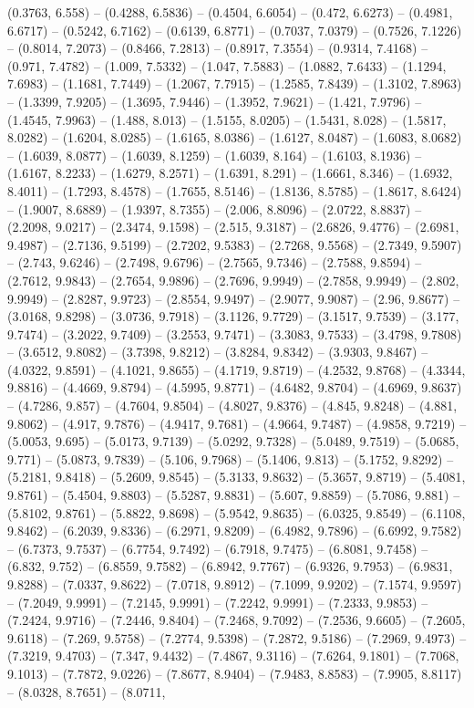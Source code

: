 (0.3763, 6.558) -- (0.4288, 6.5836) -- (0.4504, 6.6054) -- (0.472, 6.6273) -- (0.4981, 6.6717) -- (0.5242, 6.7162) -- (0.6139, 6.8771) -- (0.7037, 7.0379) -- (0.7526, 7.1226) -- (0.8014, 7.2073) -- (0.8466, 7.2813) -- (0.8917, 7.3554) -- (0.9314, 7.4168) -- (0.971, 7.4782) -- (1.009, 7.5332) -- (1.047, 7.5883) -- (1.0882, 7.6433) -- (1.1294, 7.6983) -- (1.1681, 7.7449) -- (1.2067, 7.7915) -- (1.2585, 7.8439) -- (1.3102, 7.8963) -- (1.3399, 7.9205) -- (1.3695, 7.9446) -- (1.3952, 7.9621) -- (1.421, 7.9796) -- (1.4545, 7.9963) -- (1.488, 8.013) -- (1.5155, 8.0205) -- (1.5431, 8.028) -- (1.5817, 8.0282) -- (1.6204, 8.0285) -- (1.6165, 8.0386) -- (1.6127, 8.0487) -- (1.6083, 8.0682) -- (1.6039, 8.0877) -- (1.6039, 8.1259) -- (1.6039, 8.164) -- (1.6103, 8.1936) -- (1.6167, 8.2233) -- (1.6279, 8.2571) -- (1.6391, 8.291) -- (1.6661, 8.346) -- (1.6932, 8.4011) -- (1.7293, 8.4578) -- (1.7655, 8.5146) -- (1.8136, 8.5785) -- (1.8617, 8.6424) -- (1.9007, 8.6889) -- (1.9397, 8.7355) -- (2.006, 8.8096) -- (2.0722, 8.8837) -- (2.2098, 9.0217) -- (2.3474, 9.1598) -- (2.515, 9.3187) -- (2.6826, 9.4776) -- (2.6981, 9.4987) -- (2.7136, 9.5199) -- (2.7202, 9.5383) -- (2.7268, 9.5568) -- (2.7349, 9.5907) -- (2.743, 9.6246) -- (2.7498, 9.6796) -- (2.7565, 9.7346) -- (2.7588, 9.8594) -- (2.7612, 9.9843) -- (2.7654, 9.9896) -- (2.7696, 9.9949) -- (2.7858, 9.9949) -- (2.802, 9.9949) -- (2.8287, 9.9723) -- (2.8554, 9.9497) -- (2.9077, 9.9087) -- (2.96, 9.8677) -- (3.0168, 9.8298) -- (3.0736, 9.7918) -- (3.1126, 9.7729) -- (3.1517, 9.7539) -- (3.177, 9.7474) -- (3.2022, 9.7409) -- (3.2553, 9.7471) -- (3.3083, 9.7533) -- (3.4798, 9.7808) -- (3.6512, 9.8082) -- (3.7398, 9.8212) -- (3.8284, 9.8342) -- (3.9303, 9.8467) -- (4.0322, 9.8591) -- (4.1021, 9.8655) -- (4.1719, 9.8719) -- (4.2532, 9.8768) -- (4.3344, 9.8816) -- (4.4669, 9.8794) -- (4.5995, 9.8771) -- (4.6482, 9.8704) -- (4.6969, 9.8637) -- (4.7286, 9.857) -- (4.7604, 9.8504) -- (4.8027, 9.8376) -- (4.845, 9.8248) -- (4.881, 9.8062) -- (4.917, 9.7876) -- (4.9417, 9.7681) -- (4.9664, 9.7487) -- (4.9858, 9.7219) -- (5.0053, 9.695) -- (5.0173, 9.7139) -- (5.0292, 9.7328) -- (5.0489, 9.7519) -- (5.0685, 9.771) -- (5.0873, 9.7839) -- (5.106, 9.7968) -- (5.1406, 9.813) -- (5.1752, 9.8292) -- (5.2181, 9.8418) -- (5.2609, 9.8545) -- (5.3133, 9.8632) -- (5.3657, 9.8719) -- (5.4081, 9.8761) -- (5.4504, 9.8803) -- (5.5287, 9.8831) -- (5.607, 9.8859) -- (5.7086, 9.881) -- (5.8102, 9.8761) -- (5.8822, 9.8698) -- (5.9542, 9.8635) -- (6.0325, 9.8549) -- (6.1108, 9.8462) -- (6.2039, 9.8336) -- (6.2971, 9.8209) -- (6.4982, 9.7896) -- (6.6992, 9.7582) -- (6.7373, 9.7537) -- (6.7754, 9.7492) -- (6.7918, 9.7475) -- (6.8081, 9.7458) -- (6.832, 9.752) -- (6.8559, 9.7582) -- (6.8942, 9.7767) -- (6.9326, 9.7953) -- (6.9831, 9.8288) -- (7.0337, 9.8622) -- (7.0718, 9.8912) -- (7.1099, 9.9202) -- (7.1574, 9.9597) -- (7.2049, 9.9991) -- (7.2145, 9.9991) -- (7.2242, 9.9991) -- (7.2333, 9.9853) -- (7.2424, 9.9716) -- (7.2446, 9.8404) -- (7.2468, 9.7092) -- (7.2536, 9.6605) -- (7.2605, 9.6118) -- (7.269, 9.5758) -- (7.2774, 9.5398) -- (7.2872, 9.5186) -- (7.2969, 9.4973) -- (7.3219, 9.4703) -- (7.347, 9.4432) -- (7.4867, 9.3116) -- (7.6264, 9.1801) -- (7.7068, 9.1013) -- (7.7872, 9.0226) -- (7.8677, 8.9404) -- (7.9483, 8.8583) -- (7.9905, 8.8117) -- (8.0328, 8.7651) -- (8.0711, 